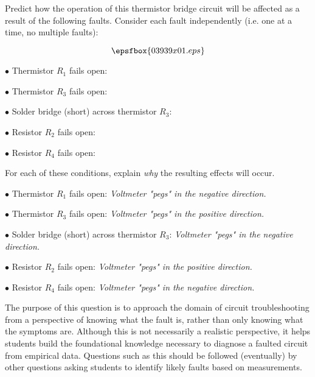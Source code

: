 

Predict how the operation of this thermistor bridge circuit will be affected as a result of the following faults.  Consider each fault independently (i.e. one at a time, no multiple faults):

$$\epsfbox{03939x01.eps}$$

\medskip
\item{$\bullet$} Thermistor $R_1$ fails open:
\vskip 5pt
\item{$\bullet$} Thermistor $R_3$ fails open:
\vskip 5pt
\item{$\bullet$} Solder bridge (short) across thermistor $R_3$:
\vskip 5pt
\item{$\bullet$} Resistor $R_2$ fails open:
\vskip 5pt
\item{$\bullet$} Resistor $R_4$ fails open:
\medskip

For each of these conditions, explain {\it why} the resulting effects will occur.







\medskip
\item{$\bullet$} Thermistor $R_1$ fails open: {\it Voltmeter "pegs" in the negative direction.}
\vskip 5pt
\item{$\bullet$} Thermistor $R_3$ fails open: {\it Voltmeter "pegs" in the positive direction.}
\vskip 5pt
\item{$\bullet$} Solder bridge (short) across thermistor $R_3$: {\it Voltmeter "pegs" in the negative direction.}
\vskip 5pt
\item{$\bullet$} Resistor $R_2$ fails open: {\it Voltmeter "pegs" in the positive direction.}
\vskip 5pt
\item{$\bullet$} Resistor $R_4$ fails open: {\it Voltmeter "pegs" in the negative direction.}
\medskip







The purpose of this question is to approach the domain of circuit troubleshooting from a perspective of knowing what the fault is, rather than only knowing what the symptoms are.  Although this is not necessarily a realistic perspective, it helps students build the foundational knowledge necessary to diagnose a faulted circuit from empirical data.  Questions such as this should be followed (eventually) by other questions asking students to identify likely faults based on measurements.




